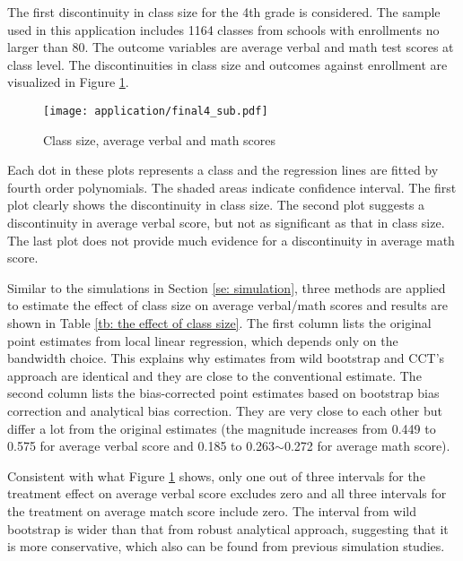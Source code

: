 \documentclass[12pt,]{article}
\DeclareMathOperator{\1}{\mathbbm{1}}
\begin{document}
The first discontinuity in class size for the 4th grade is considered. The sample used in this application includes 1164 classes from schools with enrollments no larger than 80. The outcome variables are average verbal and math test scores at class level. The discontinuities in class size and outcomes against enrollment are visualized in Figure \ref{fig: discontinuity}.
\begin{figure}[t]
	\small
	\centering
	\texttt{[image: application/final4\_sub.pdf]}
	\caption{Class size, average verbal and math scores}
	\label{fig: discontinuity}
\end{figure} 
Each dot in these plots represents a class and the regression lines are fitted by fourth order polynomials. The shaded areas indicate confidence interval. The first plot clearly shows the discontinuity in class size. The second plot suggests a discontinuity in average verbal score, but not as significant as that in class size. The last plot does not provide much evidence for a discontinuity in average math score. 

Similar to the simulations in Section \ref{se: simulation}, three methods are applied to estimate the effect of class size on average verbal/math scores and results are shown in Table \ref{tb: the effect of class size}. The first column lists the original point estimates from local linear regression, which depends only on the bandwidth choice. This explains why estimates from wild bootstrap and CCT's approach are identical and they are close to the conventional estimate. The second column lists the bias-corrected point estimates based on bootstrap bias correction and analytical bias correction. They are very close to each other but differ a lot from the original estimates (the magnitude increases from 0.449 to 0.575 for average verbal score and 0.185 to 0.263$\sim$0.272 for average math score).

Consistent with what Figure \ref{fig: discontinuity} shows, only one out of three intervals for the treatment effect on average verbal score excludes zero and all three intervals for the treatment on average match score include zero. The interval from wild bootstrap is wider than that from robust analytical approach, suggesting that it is more conservative, which also can be found from previous simulation studies.
\end{document}
